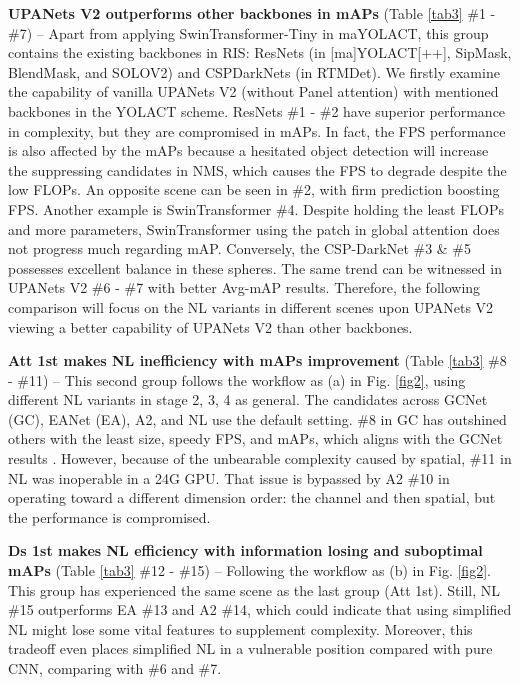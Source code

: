 \documentclass{article}
\begin{document}
\textbf{UPANets V2 outperforms other backbones in mAPs} (Table \ref{tab3} \#1 - \#7) – Apart from applying SwinTransformer-Tiny in maYOLACT, this group contains the existing backbones in RIS: ResNets (in [ma]YOLACT[++], SipMask, BlendMask, and SOLOV2) and CSPDarkNets (in RTMDet). We firstly examine the capability of vanilla UPANets V2 (without Panel attention) with mentioned backbones in the YOLACT scheme. ResNets \#1 - \#2 have superior performance in complexity, but they are compromised in mAPs. In fact, the FPS performance is also affected by the mAPs because a hesitated object detection will increase the suppressing candidates in NMS, which causes the FPS to degrade despite the low FLOPs. An opposite scene can be seen in \#2, with firm prediction boosting FPS. Another example is SwinTransformer \#4. Despite holding the least FLOPs and more parameters, SwinTransformer using the patch in global attention does not progress much regarding mAP. Conversely, the CSP-DarkNet \#3 \& \#5 possesses excellent balance in these spheres. The same trend can be witnessed in UPANets V2 \#6 - \#7 with better Avg-mAP results. Therefore, the following comparison will focus on the NL variants in different scenes upon UPANets V2 viewing a better capability of UPANets V2 than other backbones.

\textbf{Att 1st makes NL inefficiency with mAPs improvement} (Table \ref{tab3} \#8 - \#11) – This second group follows the workflow as (a) in Fig. \ref{fig2}, using different NL variants in stage {2, 3, 4} as general. The candidates across GCNet (GC), EANet (EA), A2, and NL use the default setting. \#8 in GC has outshined others with the least size, speedy FPS, and mAPs, which aligns with the GCNet results \cite{cao2019gcnet}. However, because of the unbearable complexity caused by spatial, \#11 in NL was inoperable in a 24G GPU. That issue is bypassed by A2 \#10 in operating toward a different dimension order: the channel and then spatial, but the performance is compromised. 

\textbf{Ds 1st makes NL efficiency with information losing and suboptimal mAPs} (Table \ref{tab3} \#12 - \#15) – Following the workflow as (b) in Fig. \ref{fig2}. This group has experienced the same scene as the last group (Att 1st). Still, NL \#15 outperforms EA \#13 and A2 \#14, which could indicate that using simplified NL might lose some vital features to supplement complexity. Moreover, this tradeoff even places simplified NL in a vulnerable position compared with pure CNN, comparing with \#6 and \#7.
\end{document}
